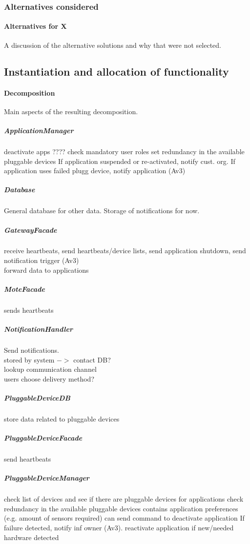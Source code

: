 \subsubsection{Alternatives considered}
    \paragraph{Alternatives for X}
    A discussion of the alternative solutions and why that were not selected.


\subsection{Instantiation and allocation of functionality}
    \paragraph{Decomposition}
    Main aspects of the resulting decomposition.

    \subparagraph{ApplicationManager}
    deactivate apps
    ???? check mandatory user roles
    set redundancy in the available pluggable devices
    If application suspended or re-activated, notify cust. org.
    If application uses failed plugg device, notify application
    (Av3)

    \subparagraph{Database}
    General database for other data. Storage of notifications for now.

    \subparagraph{GatewayFacade}
    receive heartbeats, send heartbeats/device lists, send application shutdown, send notification trigger (Av3)\\
    forward data to applications

    \subparagraph{MoteFacade}
    sends heartbeats

    \subparagraph{NotificationHandler}
    Send notifications. \\
    stored by system \(->\) contact DB? \\
    lookup communication channel \\
    users choose delivery method?

    \subparagraph{PluggableDeviceDB}
    store data related to pluggable devices

    \subparagraph{PluggableDeviceFacade}
    send heartbeats

    \subparagraph{PluggableDeviceManager}
    check list of devices and see if there are pluggable devices for applications
    check redundancy in the available pluggable devices
    contains application preferences (e.g. amount of sensors required)
    can send command to deactivate application
    If failure detected, notify inf owner (Av3).
    reactivate application if new/needed hardware detected

